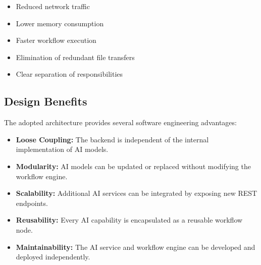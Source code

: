 \begin{itemize}
    \item Reduced network traffic
    \item Lower memory consumption
    \item Faster workflow execution
    \item Elimination of redundant file transfers
    \item Clear separation of responsibilities
\end{itemize}


\subsection{Design Benefits}

The adopted architecture provides several software engineering advantages:

\begin{itemize}
    \item \textbf{Loose Coupling:} The backend is independent of the internal implementation of AI models.
    
    \item \textbf{Modularity:} AI models can be updated or replaced without modifying the workflow engine.
    
    \item \textbf{Scalability:} Additional AI services can be integrated by exposing new REST endpoints.
    
    \item \textbf{Reusability:} Every AI capability is encapsulated as a reusable workflow node.
    
    \item \textbf{Maintainability:} The AI service and workflow engine can be developed and deployed independently.
\end{itemize}